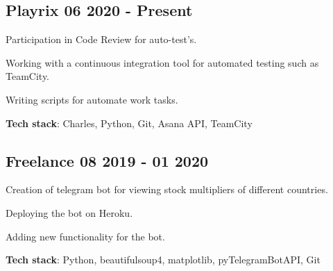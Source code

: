 \documentclass[a4paper,12pt]{article}
\begin{document}


\subsection{{Playrix } \hfill 06 2020 - Present}

\begin{zitemize}
\item Participation in Code Review for auto-test's.
\item Working with a continuous integration tool for automated testing such as TeamCity.
\item Writing scripts for automate work tasks.
\end{zitemize}

\textbf {Tech stack}: Charles, Python, Git, Asana API, TeamCity


\vspace*{8pt}

\subsection{{Freelance } \hfill 08 2019 - 01 2020}

\begin{zitemize}
\item Creation of telegram bot for viewing stock multipliers of different countries.
\item Deploying the bot on Heroku.
\item Adding new functionality for the bot.
\end{zitemize}

\textbf {Tech stack}: Python, beautifulsoup4, matplotlib, pyTelegramBotAPI, Git
\end{document}
